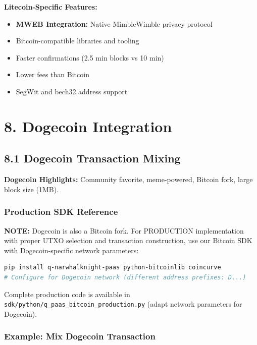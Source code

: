 \documentclass[11pt,a4paper]{article}
\begin{document}
\textbf{Litecoin-Specific Features:}
\begin{itemize}
    \item \textbf{MWEB Integration:} Native MimbleWimble privacy protocol
    \item Bitcoin-compatible libraries and tooling
    \item Faster confirmations (2.5 min blocks vs 10 min)
    \item Lower fees than Bitcoin
    \item SegWit and bech32 address support
\end{itemize}

\section{8. Dogecoin Integration}

\subsection{8.1 Dogecoin Transaction Mixing}

\textbf{Dogecoin Highlights:} Community favorite, meme-powered, Bitcoin fork, large block size (1MB).

\subsubsection{Production SDK Reference}

\textbf{NOTE:} Dogecoin is also a Bitcoin fork. For PRODUCTION implementation with proper UTXO selection and transaction construction, use our Bitcoin SDK with Dogecoin-specific network parameters:

\begin{lstlisting}[language=bash]
pip install q-narwhalknight-paas python-bitcoinlib coincurve
# Configure for Dogecoin network (different address prefixes: D...)
\end{lstlisting}

Complete production code is available in \texttt{sdk/python/q\_paas\_bitcoin\_production.py} (adapt network parameters for Dogecoin).

\subsubsection{Example: Mix Dogecoin Transaction}
\end{document}
